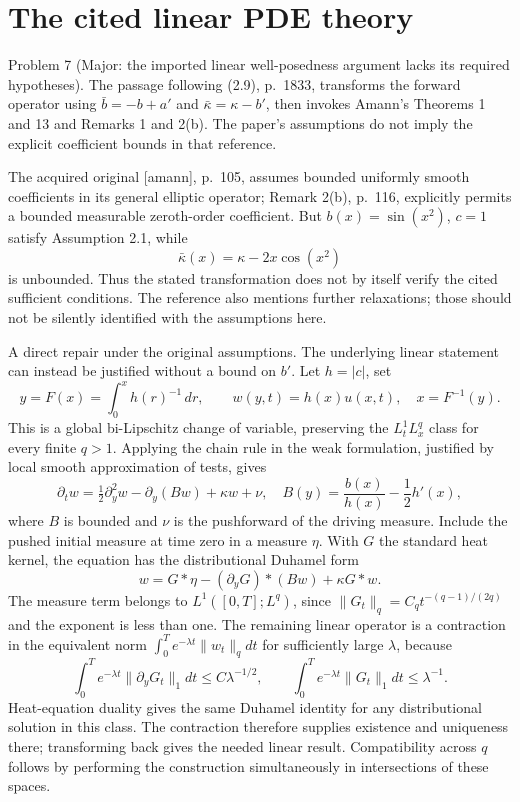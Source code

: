 \documentclass[10pt]{article}
\begin{document}
\section*{The cited linear PDE theory}
Problem 7 (Major: the imported linear well-posedness argument lacks its required hypotheses).  The passage following (2.9), p. 1833, transforms the forward operator using \(\bar b=-b+a'\) and \(\bar\kappa=\kappa-b'\), then invokes Amann’s Theorems 1 and 13 and Remarks 1 and 2(b). The paper’s assumptions do not imply the explicit coefficient bounds in that reference.\par
The acquired original [amann], p. 105, assumes bounded uniformly smooth coefficients in its general elliptic operator; Remark 2(b), p. 116, explicitly permits a bounded measurable zeroth-order coefficient. But \(b(x)=\sin(x^2)\), \(c=1\) satisfy Assumption 2.1, while \[\bar\kappa(x)=\kappa-2x\cos(x^2)\] is unbounded. Thus the stated transformation does not by itself verify the cited sufficient conditions. The reference also mentions further relaxations; those should not be silently identified with the assumptions here.\par
A direct repair under the original assumptions. The underlying linear statement can instead be justified without a bound on \(b'\). Let \(h=|c|\), set \[y=F(x)=\int_0^x h(r)^{-1}\,dr,\qquad
w(y,t)=h(x)u(x,t),\quad x=F^{-1}(y).\] This is a global bi-Lipschitz change of variable, preserving the \(L^1_tL^q_x\) class for every finite \(q>1\). Applying the chain rule in the weak formulation, justified by local smooth approximation of tests, gives \[\partial_tw=\tfrac12\partial_y^2w-\partial_y(Bw)+\kappa w+\nu,
\quad
B(y)=\frac{b(x)}{h(x)}-\frac12h'(x),\] where \(B\) is bounded and \(\nu\) is the pushforward of the driving measure. Include the pushed initial measure at time zero in a measure \(\eta\). With \(G\) the standard heat kernel, the equation has the distributional Duhamel form \[w=G*\eta-(\partial_yG)*(Bw)+\kappa G*w.\] The measure term belongs to \(L^1([0,T];L^q)\), since \(\|G_t\|_q=C_qt^{-(q-1)/(2q)}\) and the exponent is less than one. The remaining linear operator is a contraction in the equivalent norm \(\int_0^T e^{-\lambda t}\|w_t\|_qdt\) for sufficiently large \(\lambda\), because \[\int_0^T e^{-\lambda t}\|\partial_yG_t\|_1dt
\leq C\lambda^{-1/2},\qquad
\int_0^T e^{-\lambda t}\|G_t\|_1dt\leq\lambda^{-1}.\] Heat-equation duality gives the same Duhamel identity for any distributional solution in this class. The contraction therefore supplies existence and uniqueness there; transforming back gives the needed linear result. Compatibility across \(q\) follows by performing the construction simultaneously in intersections of these spaces.\par
\end{document}
